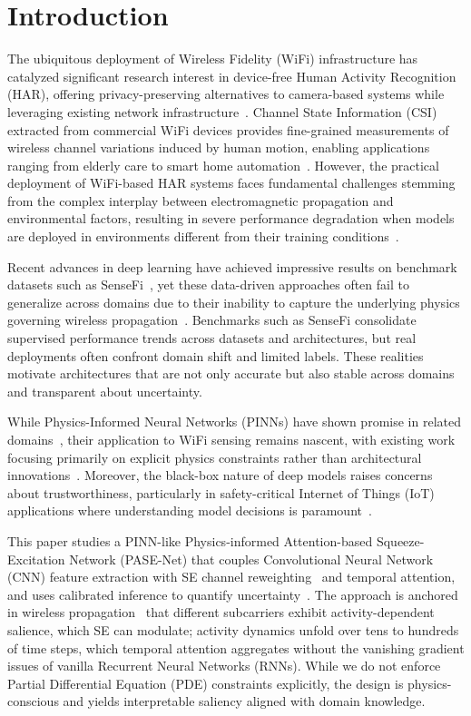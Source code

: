 \documentclass[lettersize,journal]{IEEEtran}
\begin{document}
\section{Introduction}
The ubiquitous deployment of Wireless Fidelity (WiFi) infrastructure has catalyzed significant research interest in device-free Human Activity Recognition (HAR), offering privacy-preserving alternatives to camera-based systems while leveraging existing network infrastructure~\cite{liu2024wifi,wang2023privacy}. Channel State Information (CSI) extracted from commercial WiFi devices provides fine-grained measurements of wireless channel variations induced by human motion, enabling applications ranging from elderly care to smart home automation~\cite{zhang2023attention,iotj2023applications}. However, the practical deployment of WiFi-based HAR systems faces fundamental challenges stemming from the complex interplay between electromagnetic propagation and environmental factors, resulting in severe performance degradation when models are deployed in environments different from their training conditions~\cite{li2024cross,domain2023shift}.

Recent advances in deep learning have achieved impressive results on benchmark datasets such as SenseFi~\cite{yang2023sensefi}, yet these data-driven approaches often fail to generalize across domains due to their inability to capture the underlying physics governing wireless propagation~\cite{chen2022physics,pinn2023wireless}. Benchmarks such as SenseFi consolidate supervised performance trends across datasets and architectures, but real deployments often confront domain shift and limited labels. These realities motivate architectures that are not only accurate but also stable across domains and transparent about uncertainty.

While Physics-Informed Neural Networks (PINNs) have shown promise in related domains~\cite{raissi2019physics,karniadakis2021physics}, their application to WiFi sensing remains nascent, with existing work focusing primarily on explicit physics constraints rather than architectural innovations~\cite{physics2023sensing}. Moreover, the black-box nature of deep models raises concerns about trustworthiness, particularly in safety-critical Internet of Things (IoT) applications where understanding model decisions is paramount~\cite{trustworthy2023iot,calibration_guo2017}.

This paper studies a PINN-like Physics-informed Attention-based Squeeze-Excitation Network (PASE-Net) that couples Convolutional Neural Network (CNN) feature extraction with SE channel reweighting~\cite{se_networks2018} and temporal attention, and uses calibrated inference to quantify uncertainty~\cite{calibration_guo2017}. The approach is anchored in wireless propagation~\cite{goldsmith2005wireless} that different subcarriers exhibit activity-dependent salience, which SE can modulate; activity dynamics unfold over tens to hundreds of time steps, which temporal attention aggregates without the vanishing gradient issues of vanilla Recurrent Neural Networks (RNNs). While we do not enforce Partial Differential Equation (PDE) constraints explicitly, the design is physics-conscious and yields interpretable saliency aligned with domain knowledge.
\end{document}
